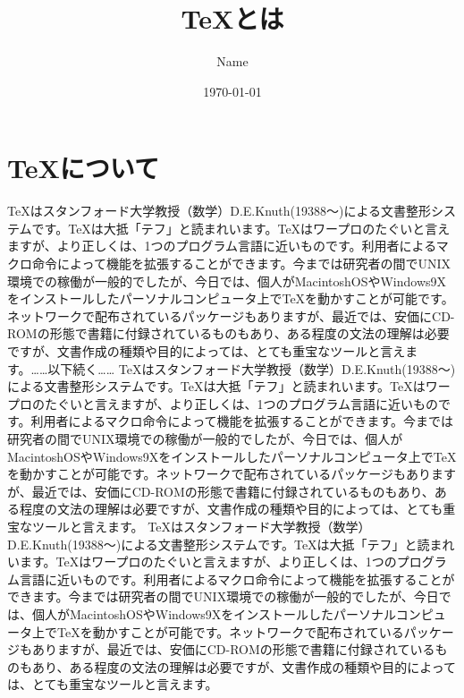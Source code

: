 \documentclass[twocolumn,10pt]{jarticle}
\title{\TeX とは}
\author{Name}
\date{\today}
\begin{document}
\maketitle
\section{\TeX について}
TeXはスタンフォード大学教授（数学）D.E.Knuth(19388～)による文書整形システムです。TeXは大抵「テフ」と読まれいます。TeXはワープロのたぐいと言えますが、より正しくは、1つのプログラム言語に近いものです。利用者によるマクロ命令によって機能を拡張することができます。今までは研究者の間でUNIX環境での稼働が一般的でしたが、今日では、個人がMacintoshOSやWindows9Xをインストールしたパーソナルコンピュータ上でTeXを動かすことが可能です。ネットワークで配布されているパッケージもありますが、最近では、安価にCD-ROMの形態で書籍に付録されているものもあり、ある程度の文法の理解は必要ですが、文書作成の種類や目的によっては、とても重宝なツールと言えます。……以下続く……
TeXはスタンフォード大学教授（数学）D.E.Knuth(19388～)による文書整形システムです。TeXは大抵「テフ」と読まれいます。TeXはワープロのたぐいと言えますが、より正しくは、1つのプログラム言語に近いものです。利用者によるマクロ命令によって機能を拡張することができます。今までは研究者の間でUNIX環境での稼働が一般的でしたが、今日では、個人がMacintoshOSやWindows9Xをインストールしたパーソナルコンピュータ上でTeXを動かすことが可能です。ネットワークで配布されているパッケージもありますが、最近では、安価にCD-ROMの形態で書籍に付録されているものもあり、ある程度の文法の理解は必要ですが、文書作成の種類や目的によっては、とても重宝なツールと言えます。
TeXはスタンフォード大学教授（数学）D.E.Knuth(19388～)による文書整形システムです。TeXは大抵「テフ」と読まれいます。TeXはワープロのたぐいと言えますが、より正しくは、1つのプログラム言語に近いものです。利用者によるマクロ命令によって機能を拡張することができます。今までは研究者の間でUNIX環境での稼働が一般的でしたが、今日では、個人がMacintoshOSやWindows9Xをインストールしたパーソナルコンピュータ上でTeXを動かすことが可能です。ネットワークで配布されているパッケージもありますが、最近では、安価にCD-ROMの形態で書籍に付録されているものもあり、ある程度の文法の理解は必要ですが、文書作成の種類や目的によっては、とても重宝なツールと言えます。
\end{document}
